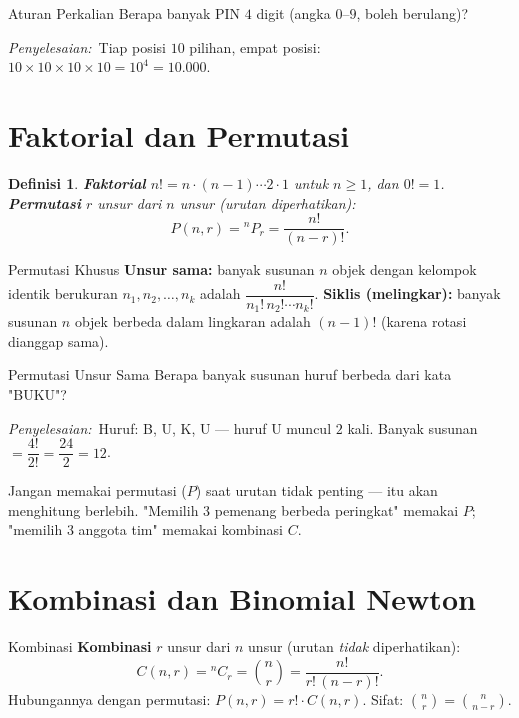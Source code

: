 \documentclass[11pt,a4paper]{report}
\theoremstyle{gaya}
\newtheorem{definisi}{Definisi}[chapter]
\newcommand{\jawab}{\par\smallskip\noindent\textit{\textcolor{oranye}{Penyelesaian:}}\ }
\begin{document}
\begin{contoh}{Aturan Perkalian}
Berapa banyak PIN $4$ digit (angka $0$--$9$, boleh berulang)?

\jawab Tiap posisi $10$ pilihan, empat posisi: $10\times10\times10\times10=10^4=10.000$.
\end{contoh}

\section{Faktorial dan Permutasi}
\begin{definisi}
\textbf{Faktorial} $n!=n\cdot(n-1)\cdots2\cdot1$ untuk $n\ge1$, dan $0!=1$. \textbf{Permutasi} $r$ unsur dari $n$ unsur (urutan diperhatikan):
\[
P(n,r)={}^{n}P_{r}=\frac{n!}{(n-r)!}.
\]
\end{definisi}

\begin{konsep}{Permutasi Khusus}
\textbf{Unsur sama:} banyak susunan $n$ objek dengan kelompok identik berukuran $n_1,n_2,\dots,n_k$ adalah $\dfrac{n!}{n_1!\,n_2!\cdots n_k!}$. \textbf{Siklis (melingkar):} banyak susunan $n$ objek berbeda dalam lingkaran adalah $(n-1)!$ (karena rotasi dianggap sama).
\end{konsep}

\begin{contoh}{Permutasi Unsur Sama}
Berapa banyak susunan huruf berbeda dari kata "BUKU"?

\jawab Huruf: B, U, K, U --- huruf U muncul $2$ kali. Banyak susunan $=\dfrac{4!}{2!}=\dfrac{24}{2}=12$.
\end{contoh}

\begin{kesalahan}
Jangan memakai permutasi ($P$) saat urutan tidak penting --- itu akan menghitung berlebih. "Memilih 3 pemenang berbeda peringkat" memakai $P$; "memilih 3 anggota tim" memakai kombinasi $C$.
\end{kesalahan}

\section{Kombinasi dan Binomial Newton}
\begin{konsep}{Kombinasi}
\textbf{Kombinasi} $r$ unsur dari $n$ unsur (urutan \emph{tidak} diperhatikan):
\[
C(n,r)={}^{n}C_{r}=\binom{n}{r}=\frac{n!}{r!\,(n-r)!}.
\]
Hubungannya dengan permutasi: $P(n,r)=r!\cdot C(n,r)$. Sifat: $\binom{n}{r}=\binom{n}{n-r}$.
\end{konsep}
\end{document}
